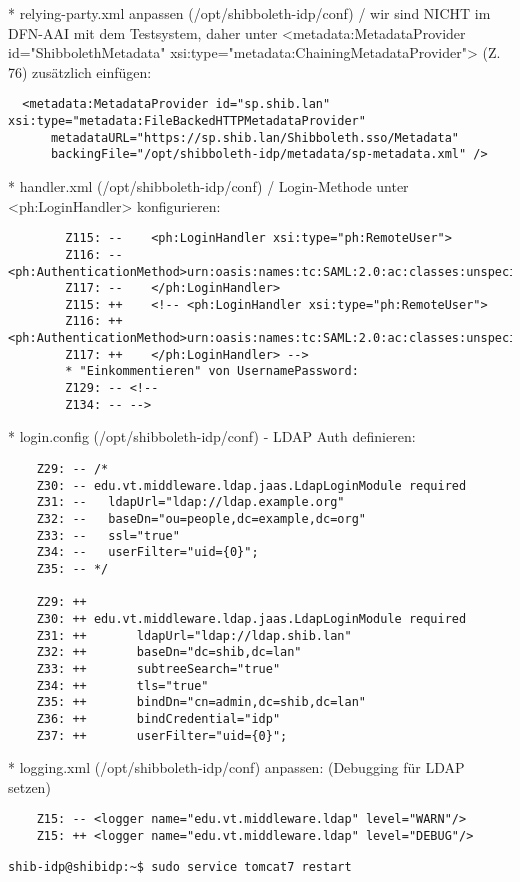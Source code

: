 * relying-party.xml anpassen (/opt/shibboleth-idp/conf) / wir sind NICHT im
DFN-AAI mit dem Testsystem, daher unter <metadata:MetadataProvider
id="ShibbolethMetadata" xsi:type="metadata:ChainingMetadataProvider"> (Z. 76) zusätzlich einfügen:
\begin{lstlisting}
  <metadata:MetadataProvider id="sp.shib.lan" xsi:type="metadata:FileBackedHTTPMetadataProvider"
      metadataURL="https://sp.shib.lan/Shibboleth.sso/Metadata"
      backingFile="/opt/shibboleth-idp/metadata/sp-metadata.xml" />
\end{lstlisting}
* handler.xml (/opt/shibboleth-idp/conf) / Login-Methode unter <ph:LoginHandler>
konfigurieren:
\begin{lstlisting}
		Z115: --    <ph:LoginHandler xsi:type="ph:RemoteUser">
		Z116: --		<ph:AuthenticationMethod>urn:oasis:names:tc:SAML:2.0:ac:classes:unspecified</ph:AuthenticationMethod>
		Z117: --	</ph:LoginHandler>
		Z115: ++    <!-- <ph:LoginHandler xsi:type="ph:RemoteUser">
		Z116: ++		<ph:AuthenticationMethod>urn:oasis:names:tc:SAML:2.0:ac:classes:unspecified</ph:AuthenticationMethod>
		Z117: ++	</ph:LoginHandler> -->
		* "Einkommentieren" von UsernamePassword:
		Z129: -- <!--
		Z134: -- -->
\end{lstlisting}
* login.config (/opt/shibboleth-idp/conf) - LDAP Auth definieren:
\begin{lstlisting}
	Z29: -- /*
	Z30: --	edu.vt.middleware.ldap.jaas.LdapLoginModule required
	Z31: --	  ldapUrl="ldap://ldap.example.org"
	Z32: --	  baseDn="ou=people,dc=example,dc=org"
	Z33: --	  ssl="true"
	Z34: --	  userFilter="uid={0}";
	Z35: --	*/

	Z29: ++
	Z30: ++ edu.vt.middleware.ldap.jaas.LdapLoginModule required
	Z31: ++ 	  ldapUrl="ldap://ldap.shib.lan"
	Z32: ++ 	  baseDn="dc=shib,dc=lan"
	Z33: ++	      subtreeSearch="true"
	Z34: ++ 	  tls="true"
	Z35: ++ 	  bindDn="cn=admin,dc=shib,dc=lan"
	Z36: ++ 	  bindCredential="idp"
	Z37: ++ 	  userFilter="uid={0}";
\end{lstlisting}
* logging.xml (/opt/shibboleth-idp/conf) anpassen: (Debugging für LDAP setzen)
\begin{lstlisting}
	Z15: -- <logger name="edu.vt.middleware.ldap" level="WARN"/>
	Z15: ++ <logger name="edu.vt.middleware.ldap" level="DEBUG"/>
\end{lstlisting}
\begin{lstlisting}
shib-idp@shibidp:~$ sudo service tomcat7 restart
\end{lstlisting}

